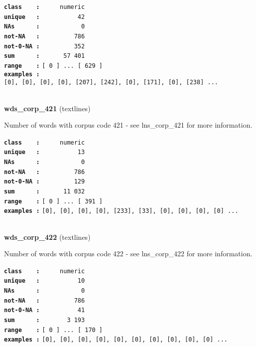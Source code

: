 \documentclass[]{article}
\begin{document}
\textbf{\texttt{class\ \ \ \ :}} \texttt{~~~~~numeric}\\
\textbf{\texttt{unique\ \ \ :}} \texttt{~~~~~~~~~~42}\\
\textbf{\texttt{NAs\ \ \ \ \ \ :}} \texttt{~~~~~~~~~~~0}\\
\textbf{\texttt{not-NA\ \ \ :}} \texttt{~~~~~~~~~786}\\
\textbf{\texttt{not-0-NA\ :}} \texttt{~~~~~~~~~352}\\
\textbf{\texttt{sum\ \ \ \ \ \ :}} \texttt{~~~~~~57~401}\\
\textbf{\texttt{range\ \ \ \ :}}
\texttt{{[}\ 0\ {]}\ ...\ {[}\ 629\ {]}}\\
\textbf{\texttt{examples\ :}}
\texttt{{[}0{]},\ {[}0{]},\ {[}0{]},\ {[}0{]},\ {[}207{]},\ {[}242{]},\ {[}0{]},\ {[}171{]},\ {[}0{]},\ {[}238{]}\ ...}\\

~

\textbf{wds\_corp\_421} (textlines)

Number of words with corpus code 421 - see lns\_corp\_421 for more
information.

\textbf{\texttt{class\ \ \ \ :}} \texttt{~~~~~numeric}\\
\textbf{\texttt{unique\ \ \ :}} \texttt{~~~~~~~~~~13}\\
\textbf{\texttt{NAs\ \ \ \ \ \ :}} \texttt{~~~~~~~~~~~0}\\
\textbf{\texttt{not-NA\ \ \ :}} \texttt{~~~~~~~~~786}\\
\textbf{\texttt{not-0-NA\ :}} \texttt{~~~~~~~~~129}\\
\textbf{\texttt{sum\ \ \ \ \ \ :}} \texttt{~~~~~~11~032}\\
\textbf{\texttt{range\ \ \ \ :}}
\texttt{{[}\ 0\ {]}\ ...\ {[}\ 391\ {]}}\\
\textbf{\texttt{examples\ :}}
\texttt{{[}0{]},\ {[}0{]},\ {[}0{]},\ {[}0{]},\ {[}233{]},\ {[}33{]},\ {[}0{]},\ {[}0{]},\ {[}0{]},\ {[}0{]}\ ...}\\

~

\textbf{wds\_corp\_422} (textlines)

Number of words with corpus code 422 - see lns\_corp\_422 for more
information.

\textbf{\texttt{class\ \ \ \ :}} \texttt{~~~~~numeric}\\
\textbf{\texttt{unique\ \ \ :}} \texttt{~~~~~~~~~~10}\\
\textbf{\texttt{NAs\ \ \ \ \ \ :}} \texttt{~~~~~~~~~~~0}\\
\textbf{\texttt{not-NA\ \ \ :}} \texttt{~~~~~~~~~786}\\
\textbf{\texttt{not-0-NA\ :}} \texttt{~~~~~~~~~~41}\\
\textbf{\texttt{sum\ \ \ \ \ \ :}} \texttt{~~~~~~~3~193}\\
\textbf{\texttt{range\ \ \ \ :}}
\texttt{{[}\ 0\ {]}\ ...\ {[}\ 170\ {]}}\\
\textbf{\texttt{examples\ :}}
\texttt{{[}0{]},\ {[}0{]},\ {[}0{]},\ {[}0{]},\ {[}0{]},\ {[}0{]},\ {[}0{]},\ {[}0{]},\ {[}0{]},\ {[}0{]}\ ...}\\
\end{document}
